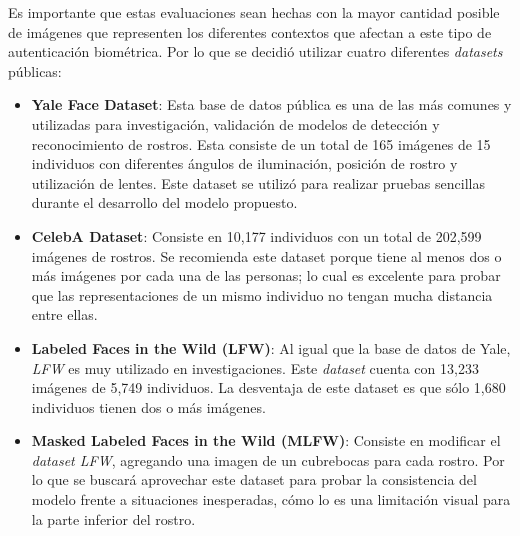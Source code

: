 \documentclass[letterpaper, 10 pt, conference]{ieeeconf}  %
\begin{document}
    Es importante que estas evaluaciones sean hechas con la mayor cantidad posible de imágenes que
    representen los diferentes contextos que afectan a este tipo de autenticación biométrica. Por
    lo que se decidió utilizar cuatro diferentes \textit{datasets} públicas:
    \begin{itemize}
        \item \textbf{Yale Face Dataset}: Esta base de datos pública es una de las más comunes y
            utilizadas para investigación, validación de modelos de detección y reconocimiento de
            rostros. Esta consiste de un total de 165 imágenes de 15 individuos con diferentes
            ángulos de iluminación, posición de rostro y utilización de lentes. Este dataset se
            utilizó para realizar pruebas sencillas durante el desarrollo del modelo propuesto.
        \item \textbf{CelebA Dataset}\cite{CELEBA}: Consiste en 10,177 individuos con un total de
            202,599 imágenes de rostros. Se recomienda este dataset porque tiene al menos dos o más
            imágenes por cada una de las personas; lo cual es excelente para probar que las
            representaciones de un mismo individuo no tengan mucha distancia entre ellas.
        \item \textbf{Labeled Faces in the Wild (LFW)}\cite{LFW}: Al igual que la base de datos de
            Yale, \textit{LFW} es muy utilizado en investigaciones. Este \textit{dataset} cuenta
            con 13,233 imágenes de 5,749 individuos. La desventaja de este dataset es que sólo
            1,680 individuos tienen dos o más imágenes.
        \item \textbf{Masked Labeled Faces in the Wild (MLFW)}\cite{MLFW}: Consiste en modificar el
            \textit{dataset LFW}, agregando una imagen de un cubrebocas para cada rostro. Por lo
            que se buscará aprovechar este dataset para probar la consistencia del modelo frente
            a situaciones inesperadas, cómo lo es una limitación visual para la parte inferior del
            rostro.
    \end{itemize}
\end{document}
